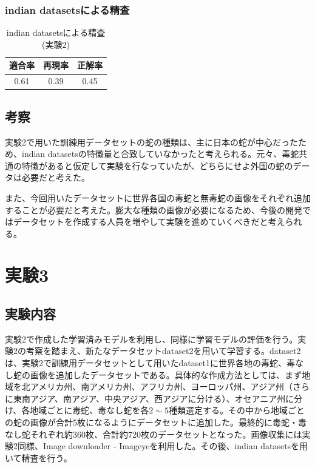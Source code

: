 \documentclass[a4paper, 11pt, titlepage]{jsarticle}
\begin{document}
\subsubsection{indian datasetsによる精査}
\begin{table}[htb]
\centering
  \caption{indian datasetsによる精査(実験2)}
  \begin{tabular}{|c|c|c|}  \hline
    適合率 & 再現率 & 正解率 \\ \hline
    0.61 & 0.39 & 0.45 \\ \hline
  \end{tabular}
\end{table}

\subsection{考察}
実験2で用いた訓練用データセットの蛇の種類は、主に日本の蛇が中心だったため、indian datasetsの特徴量と合致していなかったと考えられる。元々、毒蛇共通の特徴があると仮定して実験を行なっていたが、どちらにせよ外国の蛇のデータは必要だと考えた。\par
また、今回用いたデータセットに世界各国の毒蛇と無毒蛇の画像をそれぞれ追加することが必要だと考えた。膨大な種類の画像が必要になるため、今後の開発ではデータセットを作成する人員を増やして実験を進めていくべきだと考えられる。

\section{実験3}
\subsection{実験内容}
実験2で作成した学習済みモデルを利用し、同様に学習モデルの評価を行う。実験2の考察を踏まえ、新たなデータセットdataset2を用いて学習する。dataset2は、実験2で訓練用データセットとして用いたdataset1に世界各地の毒蛇、毒なし蛇の画像を追加したデータセットである。具体的な作成方法としては、まず地域を北アメリカ州、南アメリカ州、アフリカ州、ヨーロッパ州、アジア州（さらに東南アジア、南アジア、中央アジア、西アジアに分ける）、オセアニア州に分け、各地域ごとに毒蛇、毒なし蛇を各$2\sim5$種類選定する。その中から地域ごとの蛇の画像が合計5枚になるようにデータセットに追加した。最終的に毒蛇・毒なし蛇それぞれ約360枚、合計約720枚のデータセットとなった。画像収集には実験2同様、Image downloader - Imageyeを利用した。その後、indian datasetsを用いて精査を行う。\par
\end{document}
